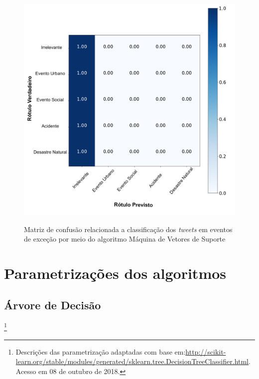 \documentclass[
	12pt,				%
	oneside,			%
	a4paper,			%
	english,			%
	brazil				%
	]{abntex2ppgsi}
\begin{document}
{{{\begin{apendicesenv}
\begin{figure}[!htb]
	\centering
 	  \caption{Matriz de confusão relacionada a classificação dos \textit{tweets} em eventos de exceção por meio do algoritmo Máquina de Vetores de Suporte}
		\includegraphics[width=1\linewidth]{images/confusion_matrix_svm_pt.png}
	\label{fig:confusion_matrix_svm}
\end{figure}

\chapter{Parametrizações dos algoritmos}
\label{apendiceF}

\section{Árvore de Decisão}\footnote{Descrições das parametrização adaptadas com base em:\url{http://scikit-learn.org/stable/modules/generated/sklearn.tree.DecisionTreeClassifier.html}. Acesso em 08 de outubro de 2018.}



\end{apendicesenv}}}}
\end{document}
